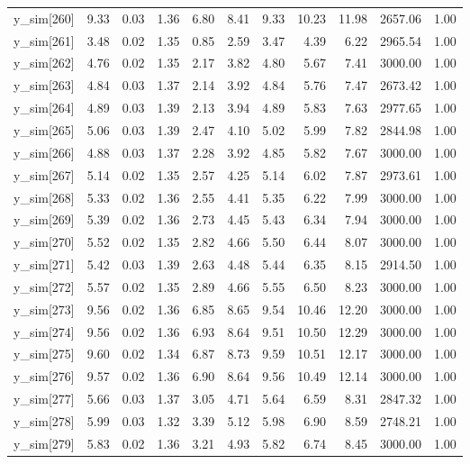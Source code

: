 \begin{table}[ht]
\begin{tabular}{rrrrrrrrrrr}
  y\_sim[260] & 9.33 & 0.03 & 1.36 & 6.80 & 8.41 & 9.33 & 10.23 & 11.98 & 2657.06 & 1.00 \\ 
  y\_sim[261] & 3.48 & 0.02 & 1.35 & 0.85 & 2.59 & 3.47 & 4.39 & 6.22 & 2965.54 & 1.00 \\ 
  y\_sim[262] & 4.76 & 0.02 & 1.35 & 2.17 & 3.82 & 4.80 & 5.67 & 7.41 & 3000.00 & 1.00 \\ 
  y\_sim[263] & 4.84 & 0.03 & 1.37 & 2.14 & 3.92 & 4.84 & 5.76 & 7.47 & 2673.42 & 1.00 \\ 
  y\_sim[264] & 4.89 & 0.03 & 1.39 & 2.13 & 3.94 & 4.89 & 5.83 & 7.63 & 2977.65 & 1.00 \\ 
  y\_sim[265] & 5.06 & 0.03 & 1.39 & 2.47 & 4.10 & 5.02 & 5.99 & 7.82 & 2844.98 & 1.00 \\ 
  y\_sim[266] & 4.88 & 0.03 & 1.37 & 2.28 & 3.92 & 4.85 & 5.82 & 7.67 & 3000.00 & 1.00 \\ 
  y\_sim[267] & 5.14 & 0.02 & 1.35 & 2.57 & 4.25 & 5.14 & 6.02 & 7.87 & 2973.61 & 1.00 \\ 
  y\_sim[268] & 5.33 & 0.02 & 1.36 & 2.55 & 4.41 & 5.35 & 6.22 & 7.99 & 3000.00 & 1.00 \\ 
  y\_sim[269] & 5.39 & 0.02 & 1.36 & 2.73 & 4.45 & 5.43 & 6.34 & 7.94 & 3000.00 & 1.00 \\ 
  y\_sim[270] & 5.52 & 0.02 & 1.35 & 2.82 & 4.66 & 5.50 & 6.44 & 8.07 & 3000.00 & 1.00 \\ 
  y\_sim[271] & 5.42 & 0.03 & 1.39 & 2.63 & 4.48 & 5.44 & 6.35 & 8.15 & 2914.50 & 1.00 \\ 
  y\_sim[272] & 5.57 & 0.02 & 1.35 & 2.89 & 4.66 & 5.55 & 6.50 & 8.23 & 3000.00 & 1.00 \\ 
  y\_sim[273] & 9.56 & 0.02 & 1.36 & 6.85 & 8.65 & 9.54 & 10.46 & 12.20 & 3000.00 & 1.00 \\ 
  y\_sim[274] & 9.56 & 0.02 & 1.36 & 6.93 & 8.64 & 9.51 & 10.50 & 12.29 & 3000.00 & 1.00 \\ 
  y\_sim[275] & 9.60 & 0.02 & 1.34 & 6.87 & 8.73 & 9.59 & 10.51 & 12.17 & 3000.00 & 1.00 \\ 
  y\_sim[276] & 9.57 & 0.02 & 1.36 & 6.90 & 8.64 & 9.56 & 10.49 & 12.14 & 3000.00 & 1.00 \\ 
  y\_sim[277] & 5.66 & 0.03 & 1.37 & 3.05 & 4.71 & 5.64 & 6.59 & 8.31 & 2847.32 & 1.00 \\ 
  y\_sim[278] & 5.99 & 0.03 & 1.32 & 3.39 & 5.12 & 5.98 & 6.90 & 8.59 & 2748.21 & 1.00 \\ 
  y\_sim[279] & 5.83 & 0.02 & 1.36 & 3.21 & 4.93 & 5.82 & 6.74 & 8.45 & 3000.00 & 1.00 \\ 

\end{tabular}
\end{table}
